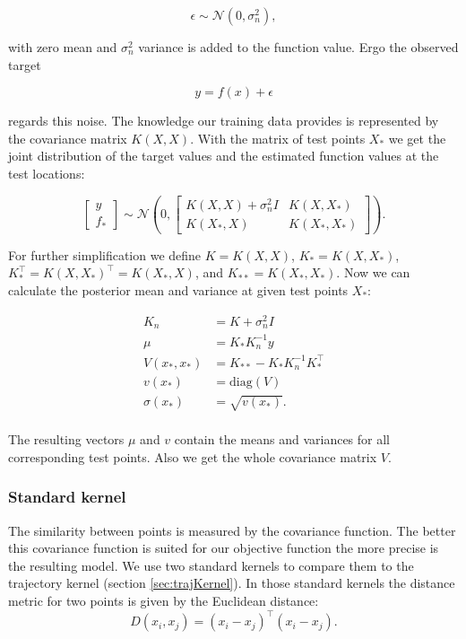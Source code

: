 $$\epsilon \sim \mathcal{N}(0,\sigma_n^2),$$

with zero mean and $\sigma_n^2$ variance is added to the function value. Ergo the observed target

$$y = f(x) + \epsilon$$

regards this noise. The knowledge our training data provides is represented by the covariance matrix $K(X,X)$. With the matrix of test points $X_*$ we get the joint distribution of the target values and the estimated function values at the test locations:

$$\left[ \begin{array}{c} y \\ f_* \end{array} \right] \sim \mathcal{N} \left(0, \begin{bmatrix} K(X,X)+\sigma_n^2 I & K(X,X_*) \\ K(X_*,X) & K(X_*,X_*) \end{bmatrix} \right).$$

For further simplification we define $K = K(X,X)$, $K_* = K(X,X_*)$, $K_*^{\top} = K(X,X_*)^{\top} = K(X_*,X)$, and $K_{**} = K(X_*,X_*)$. Now we can calculate the posterior mean and variance at given test points $X_*$:

\begin{align}
    K_n &= K+\sigma_n^2 I \label{eq:kNoise} \\
    \mu &= K_*K_n^{-1}y \label{eq:meanGauss} \\
    V(x_*,x_*) &= K_{**}-K_*K_n^{-1}K_*^\top \label{eq:wholeVar} \\
    v(x_*) &= \mathrm{diag}(V) \label{eq:vectorVar} \\
    \sigma(x_*) &= \sqrt{v(x_*)}. \label{eq:gp:stdv}\\ \nonumber
\end{align}

The resulting vectors $\mu$ and $v$ contain the means and variances for all corresponding test points. Also we get the whole covariance matrix $V$.

\subsubsection{Standard kernel}
The similarity between points is measured by the covariance function. The better this covariance function is suited for our objective function the more precise is the resulting model.
We use two standard kernels to compare them to the trajectory kernel (section \ref{sec:trajKernel}). In those standard kernels the distance metric for two points is given by the Euclidean distance:
$$D(x_i,x_j) = (x_i-x_j)^\top (x_i-x_j).$$


